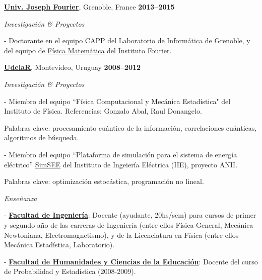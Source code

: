 \documentclass[10pt]{article}
\newenvironment{outerlist}[1][\enskip\textbullet]%
        {\begin{itemize}[#1]}{\end{itemize}%
         \vspace{-.6\baselineskip}}
\newenvironment{innerlist}[1][\enskip\textbullet]%
        {\begin{compactitem}[#1]}{\end{compactitem}}
\newcommand{\blankline}{\quad\pagebreak[2]}
\begin{document}
\blankline

\href{http://www.ujf-grenoble.fr/}{\textbf{Univ. Joseph Fourier}}, Grenoble, France
\hfill\textbf{2013--2015}

\begin{outerlist}
\item[]\textit{Investigación \& Proyectos}
\begin{innerlist}
\item[-] Doctorante en el equipo CAPP del Laboratorio de Informática de Grenoble, y del equipo de \href{http://www-fourier.ujf-grenoble.fr/?q=fr/content/physique-mathematique}{Física Matemática} del Instituto Fourier.
\end{innerlist}
\end{outerlist}

\blankline

\href{http://www.udelar.edu.uy}{\textbf{UdelaR}}, Montevideo, Uruguay 
\hfill\textbf{2008--2012}

\begin{outerlist}
\item[]\textit{Investigación \& Proyectos}
\begin{innerlist}
\item[-] Miembro del equipo ``Física Computacional y Mecánica Estadística" del Instituto de Física. Referencias: Gonzalo Abal, Raul Donangelo. 

Palabras clave: procesamiento cuántico de la información, correlaciones cuánticas, algoritmos de búsqueda. 
\item[-] Miembro del equipo ``Plataforma de simulaci\'{o}n para el sistema de energ\'{i}a el\'{e}ctrico'' \href{http://iie.fing.edu.uy/simsee/}{SimSEE} del Instituto de Ingeiería Eléctrica (IIE), proyecto ANII. 

Palabras clave: optimización estocástica, programación no lineal.
\end{innerlist}

\item[]\textit{Enseñanza}
\begin{innerlist}
	\item[-] \href{http://www.fing.edu.uy}{\textbf{Facultad de Ingenier\'ia}}: Docente (ayudante, 20hs/sem) para cursos de primer y segundo año de las carreras de Ingeniería (entre ellos Física General, Mecánica Newtoniana, Electromagnetismo), y de la Licenciatura en Física (entre ellos Mecánica Estadística, Laboratorio).
	\item[-] \href{http://www.fhuce.edu.uy/}{\textbf{Facultad de Humanidades y Ciencias de la Educaci\'{o}n}}: Docente del curso de Probabilidad y Estadística (2008-2009).
\end{innerlist}

\end{outerlist}
\end{document}
